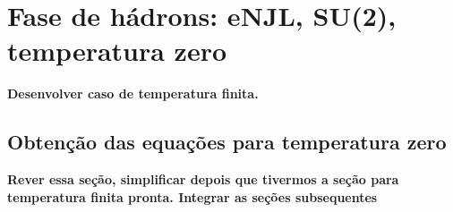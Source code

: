 
\section{Fase de hádrons: eNJL, SU(2), temperatura zero} 

\textbf{Desenvolver caso de temperatura finita.}

\subsection{Obtenção das equações para temperatura zero}

\textbf{Rever essa seção, simplificar depois que tivermos a seção para temperatura finita pronta. Integrar as seções subsequentes}

